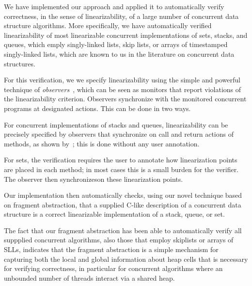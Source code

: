 
We have implemented our approach and applied it to automatically verify
correctness, in the sense of linearizability, of a large number of
concurrent data structure algorithms.
More specifically, we have automatically verified linearizability of 
most linearizable concurrent implementations
of sets, stacks, and queues, which emply singly-linked lists, skip lists, or
arrays of timestamped singly-linked lists, which are known to us in
the literature on concurrent data structures.

For this verification, we we specify linearizability
using the simple and powerful technique of
{\em observers}~\cite{AHHR:integrated}, which can be seen as monitors that
report violations of the linearizability criterion. Observers synchronize with
the monitored concurrent programs at designated actions. This can be done in
two ways.
\begin{inparaenum}[(1)]
\item
  For concurrent implementations of stacks and queues,
  linearizability can be precisely specified by
  observers that synchronize on call and return actions of
  methods, as shown by~\cite{BEEH:icalp15,HSV:concur13}; this is done without
 any user annotation.
\item
  For sets, the verification requires the user to annotate how linearization
  points are placed in each method; in most cases this is a small burden for
  the verifier. The observer then synchronizeson these 
  linearization points.
\end{inparaenum}
Our implementation then automatically checks, using our novel technique based on
fragment abstraction, that a supplied C-like description of a concurrent data structure is a correct linearizable implementation of a stack, queue, or set.

The fact that our fragment abstraction has been able to automatically verify all
suppplied concurrent algorithms, also those that employ skiplists or
arrays of SLLs, indicates that the fragment abstraction is a simple
mechanism for capturing both the local and global information about heap cells
that is necessary for verifying correctness, in particular for
concurrent algorithms where an unbounded number of threads interact
via a shared heap.

